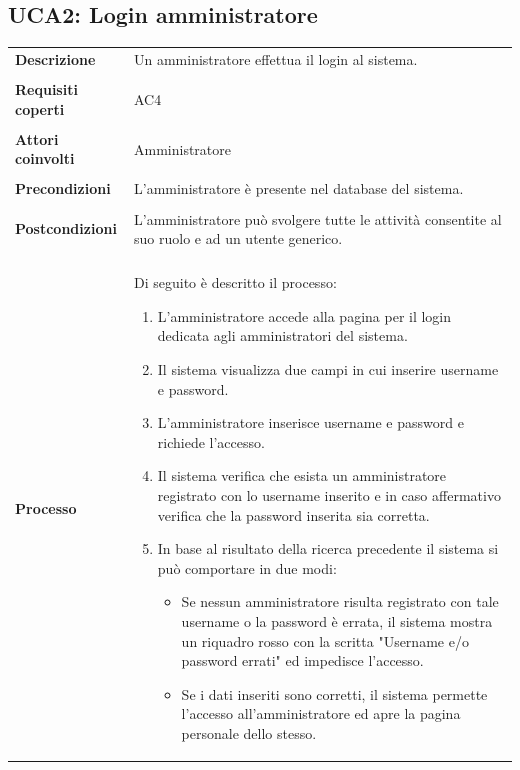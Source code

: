 \documentclass[10pt,a4paper]{report}
\begin{document}
	\subsection{UCA2: Login amministratore}
	\begin{tabular}{lp{}}
		\textbf{Descrizione}&Un amministratore effettua il login al sistema.\\
		\\
		\textbf{Requisiti coperti}&AC4\\
		\\
		\textbf{Attori coinvolti}&Amministratore\\
		\\
		\textbf{Precondizioni}&L'amministratore è presente nel database del sistema.\\
		\\
		\textbf{Postcondizioni}&L'amministratore può svolgere tutte le attività consentite al suo ruolo e ad un utente generico.\\
		\\
		\textbf{Processo}&Di seguito è descritto il processo:
		\begin{enumerate}
			\item L'amministratore accede alla pagina per il login dedicata agli amministratori del sistema.
			\item Il sistema visualizza due campi in cui inserire username e password.
			\item L'amministratore inserisce username e password e richiede l'accesso.
			\item Il sistema verifica che esista un amministratore registrato con lo username inserito e in caso affermativo verifica che la password inserita sia corretta.
			\item In base al risultato della ricerca precedente il sistema si può comportare in due modi:
			\begin{itemize}
				\item Se nessun amministratore risulta registrato con tale username o la password è errata, il sistema mostra un riquadro rosso con la scritta "Username e/o password errati" ed impedisce l'accesso.
				\item Se i dati inseriti sono corretti, il sistema permette l'accesso all'amministratore ed apre la pagina personale dello stesso.
			\end{itemize}
		\end{enumerate}
	\end{tabular}
	
\end{document}
